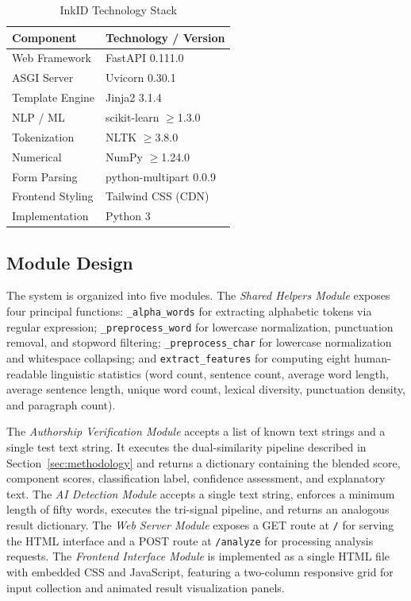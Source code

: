\documentclass[conference]{IEEEtran}
\begin{document}
\begin{table}[htbp]
\caption{InkID Technology Stack}
\begin{center}
\begin{tabular}{ll}
\toprule
\textbf{Component} & \textbf{Technology / Version} \\
\midrule
Web Framework     & FastAPI 0.111.0 \\
ASGI Server       & Uvicorn 0.30.1 \\
Template Engine   & Jinja2 3.1.4 \\
NLP / ML          & scikit-learn $\geq$1.3.0 \\
Tokenization      & NLTK $\geq$3.8.0 \\
Numerical         & NumPy $\geq$1.24.0 \\
Form Parsing      & python-multipart 0.0.9 \\
Frontend Styling  & Tailwind CSS (CDN) \\
Implementation    & Python 3 \\
\bottomrule
\end{tabular}
\end{center}
\label{tab:stack}
\end{table}

\subsection{Module Design}

The system is organized into five modules. The \textit{Shared Helpers Module}
exposes four principal functions: \texttt{\_alpha\_words} for extracting
alphabetic tokens via regular expression; \texttt{\_preprocess\_word} for
lowercase normalization, punctuation removal, and stopword filtering;
\texttt{\_preprocess\_char} for lowercase normalization and whitespace
collapsing; and \texttt{extract\_features} for computing eight human-readable
linguistic statistics (word count, sentence count, average word length,
average sentence length, unique word count, lexical diversity, punctuation
density, and paragraph count).

The \textit{Authorship Verification Module} accepts a list of known text
strings and a single test text string. It executes the dual-similarity pipeline
described in Section~\ref{sec:methodology} and returns a dictionary containing
the blended score, component scores, classification label, confidence
assessment, and explanatory text. The \textit{AI Detection Module} accepts a
single text string, enforces a minimum length of fifty words, executes the
tri-signal pipeline, and returns an analogous result dictionary. The
\textit{Web Server Module} exposes a GET route at \texttt{/} for serving the
HTML interface and a POST route at \texttt{/analyze} for processing analysis
requests. The \textit{Frontend Interface Module} is implemented as a single
HTML file with embedded CSS and JavaScript, featuring a two-column responsive
grid for input collection and animated result visualization panels.
\end{document}
